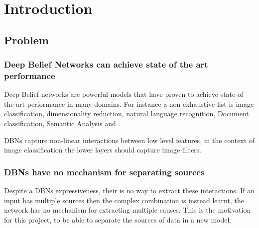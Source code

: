 \chapter{Introduction}

\section{Problem}
\subsection{Deep Belief Networks can achieve state of the art performance}
Deep Belief networks are powerful models that have proven to achieve state of the art performance in many domains. For instance a non-exhaustive list is image classification, dimensionality reduction, natural language recognition, Document classification, Semantic Analysis and .

DBNs capture non-linear interactions between low level features, in the context of image classification the lower layers should capture image filters.

\subsection{DBNs have no mechanism for separating sources}
Despite a DBNs expressiveness, their is no way to extract these interactions. If an input has multiple sources then the complex combination is instead learnt, the network has no mechanism for extracting multiple causes.
This is the motivation for this project, to be able to separate the sources of data in a new model.

 \cite{2015HistSciPy}

